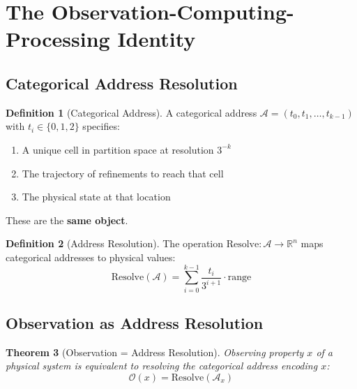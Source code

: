\documentclass[twocolumn,10pt]{article}
\newtheorem{theorem}{Theorem}[section]
\theoremstyle{definition}
\newtheorem{definition}[theorem]{Definition}
\theoremstyle{remark}
\newcommand{\Obs}{\mathcal{O}}
\begin{document}
\section{The Observation-Computing-Processing Identity}
\label{sec:identity}

\subsection{Categorical Address Resolution}

\begin{definition}[Categorical Address]
A categorical address $\mathcal{A} = (t_0, t_1, \ldots, t_{k-1})$ with $t_i \in \{0, 1, 2\}$ specifies:
\begin{enumerate}
    \item A unique cell in partition space at resolution $3^{-k}$
    \item The trajectory of refinements to reach that cell
    \item The physical state at that location
\end{enumerate}
These are the \textbf{same object}.
\end{definition}

\begin{definition}[Address Resolution]
The operation $\text{Resolve}: \mathcal{A} \to \mathbb{R}^n$ maps categorical addresses to physical values:
\begin{equation}
\text{Resolve}(\mathcal{A}) = \sum_{i=0}^{k-1} \frac{t_i}{3^{i+1}} \cdot \text{range}
\end{equation}
\end{definition}

\subsection{Observation as Address Resolution}

\begin{theorem}[Observation = Address Resolution]
\label{thm:obs}
Observing property $x$ of a physical system is equivalent to resolving the categorical address encoding $x$:
\begin{equation}
\Obs(x) = \text{Resolve}(\mathcal{A}_x)
\end{equation}
\end{theorem}
\end{document}
